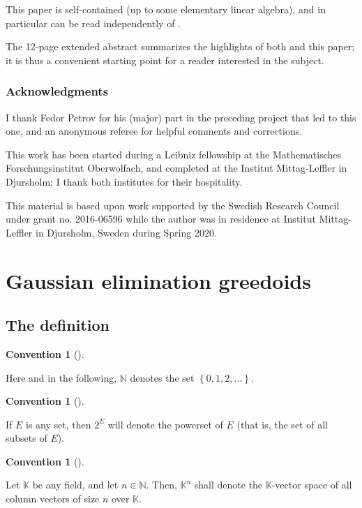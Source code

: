 \documentclass[numbers=enddot,12pt,final,onecolumn,notitlepage]{scrartcl}%
\theoremstyle{definition}
\newtheorem{conv}[theo]{Convention}
\newenvironment{convention}[1][]
{\begin{conv}[#1]\begin{leftbar}}
{\end{leftbar}\end{conv}}
\newenvironment{fineprint}{\begin{small}}{\end{small}}
\newenvironment{convention}[1][Convention]{\noindent\textbf{#1.} }{\ \rule{0.5em}{0.5em}}
\theoremstyle{plainsl}
\begin{document}
\bigskip

This paper is self-contained (up to some elementary linear algebra), and in
particular can be read independently of \cite{GriPet19}.

The 12-page extended abstract \cite{GriPet20} summarizes the highlights of
both \cite{GriPet19} and this paper; it is thus a convenient starting point
for a reader interested in the subject.

\subsubsection*{Acknowledgments}

I thank Fedor Petrov for his (major) part in the preceding project
\cite{GriPet19} that led to this one, and an anonymous referee for helpful
comments and corrections.

This work has been started during a Leibniz fellowship at the Mathematisches
Forschungsinstitut Oberwolfach, and completed at the Institut Mittag-Leffler
in Djursholm; I thank both institutes for their hospitality.

\begin{fineprint}
This material is based upon work supported by the Swedish Research Council
under grant no. 2016-06596 while the author was in residence at Institut
Mittag-Leffler in Djursholm, Sweden during Spring 2020.
\end{fineprint}

\section{\label{sect.geg}Gaussian elimination greedoids}

\subsection{The definition}

\begin{convention}
Here and in the following, $\mathbb{N}$ denotes the set $\left\{
0,1,2,\ldots\right\}  $.
\end{convention}

\begin{convention}
If $E$ is any set, then $2^{E}$ will denote the powerset of $E$ (that is, the
set of all subsets of $E$).
\end{convention}

\begin{convention}
Let $\mathbb{K}$ be any field, and let $n\in\mathbb{N}$. Then, $\mathbb{K}%
^{n}$ shall denote the $\mathbb{K}$-vector space of all column vectors of size
$n$ over $\mathbb{K}$.
\end{convention}
\end{document}
